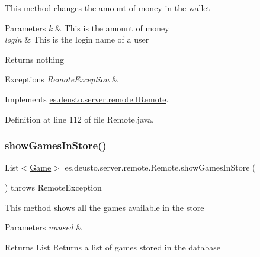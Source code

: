 This method changes the amount of money in the wallet 
\begin{DoxyParams}{Parameters}
{\em k} & This is the amount of money \\
\hline
{\em login} & This is the login name of a user \\
\hline
\end{DoxyParams}
\begin{DoxyReturn}{Returns}
nothing 
\end{DoxyReturn}

\begin{DoxyExceptions}{Exceptions}
{\em Remote\+Exception} & \\
\hline
\end{DoxyExceptions}


Implements \hyperlink{interfacees_1_1deusto_1_1server_1_1remote_1_1_i_remote_a6252daae1e76aee233294482f661160a}{es.\+deusto.\+server.\+remote.\+I\+Remote}.



Definition at line 112 of file Remote.\+java.

\mbox{\label{classes_1_1deusto_1_1server_1_1remote_1_1_remote_ae40a5882d6b3ef3d5928d87dafeb15fa}} 
\subsubsection{\texorpdfstring{show\+Games\+In\+Store()}{showGamesInStore()}}
{\footnotesize\ttfamily List$<$\hyperlink{classes_1_1deusto_1_1server_1_1db_1_1data_1_1_game}{Game}$>$ es.\+deusto.\+server.\+remote.\+Remote.\+show\+Games\+In\+Store (\begin{DoxyParamCaption}{ }\end{DoxyParamCaption}) throws Remote\+Exception}

This method shows all the games available in the store 
\begin{DoxyParams}{Parameters}
{\em unused} & \\
\hline
\end{DoxyParams}
\begin{DoxyReturn}{Returns}
List Returns a list of games stored in the database 
\end{DoxyReturn}

